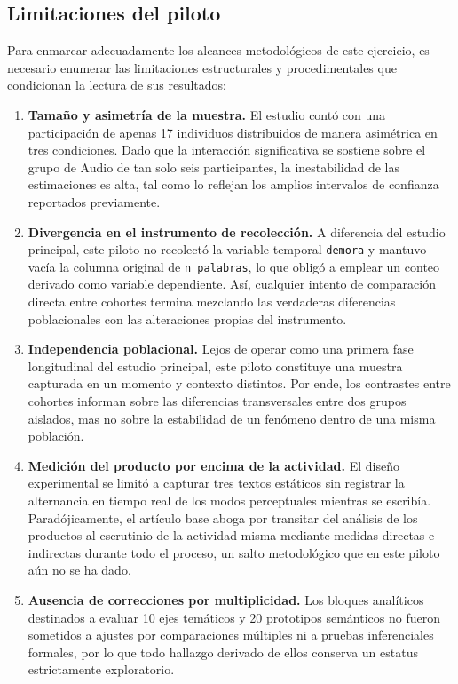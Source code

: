 \documentclass[12pt]{article}
\begin{document}
	\subsection{Limitaciones del piloto}
	
	Para enmarcar adecuadamente los alcances metodológicos de este ejercicio, es necesario enumerar las limitaciones estructurales y procedimentales que condicionan la lectura de sus resultados:
	
	\begin{enumerate}
		\item \textbf{Tamaño y asimetría de la muestra.} El estudio contó con una participación de apenas 17 individuos distribuidos de manera asimétrica en tres condiciones. Dado que la interacción significativa se sostiene sobre el grupo de Audio de tan solo seis participantes, la inestabilidad de las estimaciones es alta, tal como lo reflejan los amplios intervalos de confianza reportados previamente.
		
		\item \textbf{Divergencia en el instrumento de recolección.} A diferencia del estudio principal, este piloto no recolectó la variable temporal \texttt{demora} y mantuvo vacía la columna original de \texttt{n\_palabras}, lo que obligó a emplear un conteo derivado como variable dependiente. Así, cualquier intento de comparación directa entre cohortes termina mezclando las verdaderas diferencias poblacionales con las alteraciones propias del instrumento.
		
		\item \textbf{Independencia poblacional.} Lejos de operar como una primera fase longitudinal del estudio principal, este piloto constituye una muestra capturada en un momento y contexto distintos. Por ende, los contrastes entre cohortes informan sobre las diferencias transversales entre dos grupos aislados, mas no sobre la estabilidad de un fenómeno dentro de una misma población.
		
		\item \textbf{Medición del producto por encima de la actividad.} El diseño experimental se limitó a capturar tres textos estáticos sin registrar la alternancia en tiempo real de los modos perceptuales mientras se escribía. Paradójicamente, el artículo base aboga por transitar del análisis de los productos al escrutinio de la actividad misma mediante medidas directas e indirectas durante todo el proceso, un salto metodológico que en este piloto aún no se ha dado.
		
		\item \textbf{Ausencia de correcciones por multiplicidad.} Los bloques analíticos destinados a evaluar 10 ejes temáticos y 20 prototipos semánticos no fueron sometidos a ajustes por comparaciones múltiples ni a pruebas inferenciales formales, por lo que todo hallazgo derivado de ellos conserva un estatus estrictamente exploratorio.
		

\end{enumerate}
\end{document}
